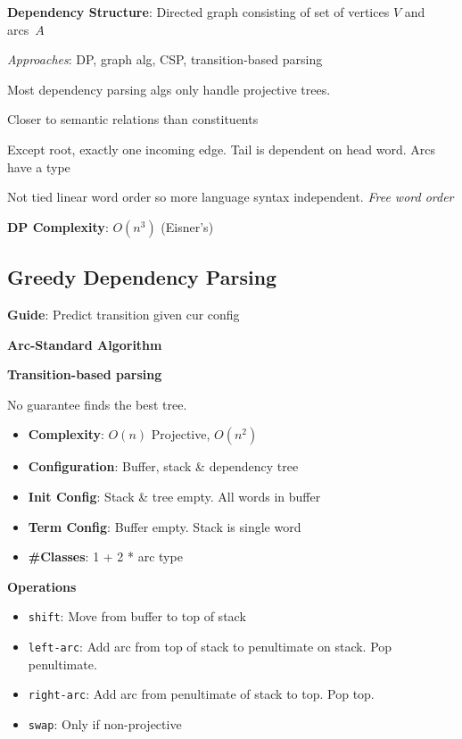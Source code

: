 \documentclass[9pt]{extarticle}
\renewcommand{\green}[1]{{\color{ForestGreen} #1}}
\newcommand{\greenbf}[1]{\textbf{\green{#1}}}
\begin{document}
\begin{multicols}{3}
  \greenbf{Dependency Structure}: Directed graph consisting of set of vertices $V$ and arcs~$A$

  \textit{Approaches}: DP, graph alg, CSP, transition-based parsing

  Most dependency parsing algs only handle projective trees.

  Closer to semantic relations than constituents

  Except root, exactly one incoming edge. Tail is dependent on head word. Arcs have a type

  Not tied linear word order so more language syntax independent. \textit{Free word order}

  \textbf{DP Complexity}: $O(n^3)$ (Eisner's)

  \subsection*{Greedy Dependency Parsing}

  \greenbf{Guide}: Predict transition given cur config

  \greenbf{Arc-Standard Algorithm}

  \textbf{Transition-based parsing}

  No guarantee finds the best tree.

  \begin{itemize}
    \item \textbf{Complexity}: $O(n)$ Projective, $O(n^2)$
    \item \textbf{Configuration}: Buffer, stack \& dependency tree
    \item \textbf{Init Config}: Stack \& tree empty. All words in buffer
    \item \textbf{Term Config}: Buffer empty. Stack is single word
    \item \textbf{\#Classes}: 1 + 2 * arc type
  \end{itemize}

  \textbf{Operations}
  \begin{itemize}
    \item \texttt{shift}: Move from buffer to top of stack
    \item \texttt{left-arc}: Add arc from top of stack to penultimate on stack. Pop penultimate.
    \item \texttt{right-arc}: Add arc from penultimate of stack to top. Pop top.
    \item \texttt{swap}: Only if non-projective
  \end{itemize}


\end{multicols}
\end{document}
